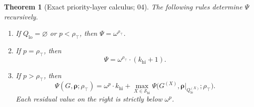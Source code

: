 \documentclass[11pt,a4paper]{article}
\newtheorem{theorem}{Theorem}[section]
\theoremstyle{definition}
\theoremstyle{remark}
\newcommand{\Qlo}{Q_{\mathrm{lo}}}
\newcommand{\rtop}{\rho_{\top}}
\begin{document}
\begin{theorem}[Exact priority-layer calculus; 04]\label{nh:ur:thm:layers}
The following rules determine $\Psi$ recursively.
\begin{enumerate}[label=(\roman*)]
\item If $\Qlo=\varnothing$ or $p<\rtop$, then $\Psi=\omega^{\rtop}$.
\item If $p=\rtop$, then
\begin{equation}\label{nh:ur:eq:layer-equal}
 \Psi=\omega^{\rtop}\cdot(k_{\mathrm{hi}}+1).
\end{equation}
\item If $p>\rtop$, then
\begin{equation}\label{nh:ur:eq:layer-main}
 \boxed{\displaystyle
 \Psi(G,\boldsymbol\rho;\rtop)=
 \omega^p\cdot k_{\mathrm{hi}}+
 \max_{X\in\mathscr S_{\mathrm{hi}}}
 \Psi\bigl(G^{(X)},\boldsymbol\rho|_{\Qlo^{(X)}};\rtop\bigr).}
\end{equation}
Each residual value on the right is strictly below $\omega^p$.
\end{enumerate}
\end{theorem}
\end{document}
